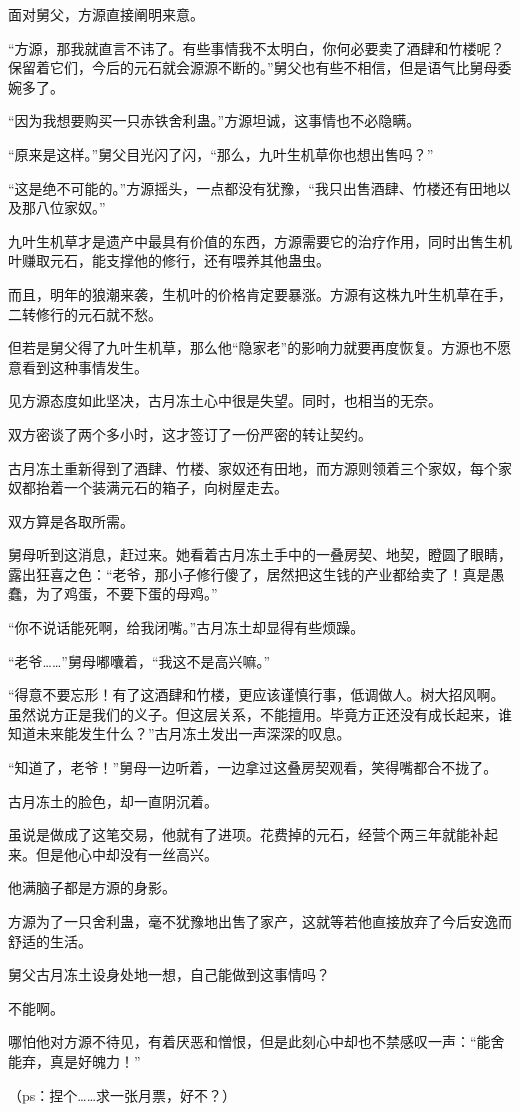 \begin{this_body}
面对舅父，方源直接阐明来意。

“方源，那我就直言不讳了。有些事情我不太明白，你何必要卖了酒肆和竹楼呢？保留着它们，今后的元石就会源源不断的。”舅父也有些不相信，但是语气比舅母委婉多了。

“因为我想要购买一只赤铁舍利蛊。”方源坦诚，这事情也不必隐瞒。

“原来是这样。”舅父目光闪了闪，“那么，九叶生机草你也想出售吗？”

“这是绝不可能的。”方源摇头，一点都没有犹豫，“我只出售酒肆、竹楼还有田地以及那八位家奴。”

九叶生机草才是遗产中最具有价值的东西，方源需要它的治疗作用，同时出售生机叶赚取元石，能支撑他的修行，还有喂养其他蛊虫。

而且，明年的狼潮来袭，生机叶的价格肯定要暴涨。方源有这株九叶生机草在手，二转修行的元石就不愁。

但若是舅父得了九叶生机草，那么他“隐家老”的影响力就要再度恢复。方源也不愿意看到这种事情发生。

见方源态度如此坚决，古月冻土心中很是失望。同时，也相当的无奈。

双方密谈了两个多小时，这才签订了一份严密的转让契约。

古月冻土重新得到了酒肆、竹楼、家奴还有田地，而方源则领着三个家奴，每个家奴都抬着一个装满元石的箱子，向树屋走去。

双方算是各取所需。

舅母听到这消息，赶过来。她看着古月冻土手中的一叠房契、地契，瞪圆了眼睛，露出狂喜之色：“老爷，那小子修行傻了，居然把这生钱的产业都给卖了！真是愚蠢，为了鸡蛋，不要下蛋的母鸡。”

“你不说话能死啊，给我闭嘴。”古月冻土却显得有些烦躁。

“老爷……”舅母嘟囔着，“我这不是高兴嘛。”

“得意不要忘形！有了这酒肆和竹楼，更应该谨慎行事，低调做人。树大招风啊。虽然说方正是我们的义子。但这层关系，不能擅用。毕竟方正还没有成长起来，谁知道未来能发生什么？”古月冻土发出一声深深的叹息。

“知道了，老爷！”舅母一边听着，一边拿过这叠房契观看，笑得嘴都合不拢了。

古月冻土的脸色，却一直阴沉着。

虽说是做成了这笔交易，他就有了进项。花费掉的元石，经营个两三年就能补起来。但是他心中却没有一丝高兴。

他满脑子都是方源的身影。

方源为了一只舍利蛊，毫不犹豫地出售了家产，这就等若他直接放弃了今后安逸而舒适的生活。

舅父古月冻土设身处地一想，自己能做到这事情吗？

不能啊。

哪怕他对方源不待见，有着厌恶和憎恨，但是此刻心中却也不禁感叹一声：“能舍能弃，真是好魄力！”

（ps：捏个……求一张月票，好不？）

\end{this_body}

